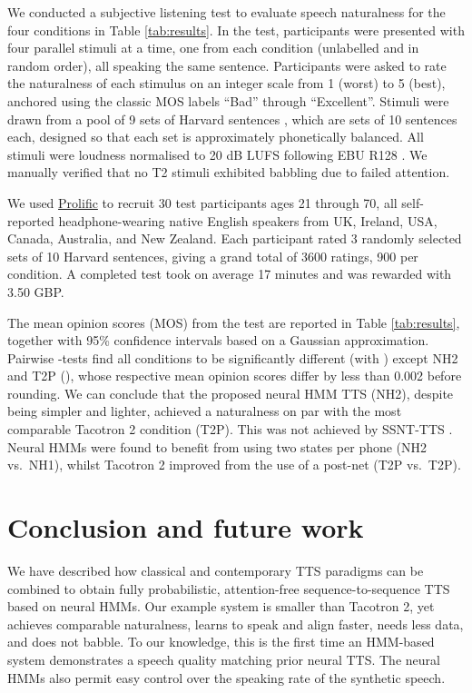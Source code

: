 \documentclass[british]{article}
\newcommand{\tc}{T2}
\newcommand{\tcp}{T2P}
\newcommand{\tcnop}{T2P}
\newcommand{\nhtwo}{NH2}
\newcommand{\nhone}{NH1}
\begin{document}
We conducted a subjective listening test to evaluate speech naturalness for the four conditions in Table \ref{tab:results}.
In the test, participants were presented with four parallel stimuli at a time, one from each condition (unlabelled and in random order), all speaking the same sentence.
Participants were asked to rate the naturalness of each stimulus on an integer scale from 1 (worst) to 5 (best), anchored using the classic MOS labels ``Bad'' through ``Excellent''.
Stimuli were drawn from a pool of 9 sets of Harvard sentences \cite{rothauser1969ieee}, which are sets of 10 sentences each, designed so that each set is approximately phonetically balanced.
All stimuli were loudness normalised to 20 dB LUFS following EBU R128 \cite{ebu2020loudness}.
We manually verified that no \tc{} stimuli exhibited babbling due to failed attention.

We used \href{https://prolific.co/}{Prolific} to recruit 30 test participants ages 21 through 70, all self-reported headphone-wearing native English speakers from UK, Ireland, USA, Canada, Australia, and New Zealand.
Each participant rated 3 randomly selected sets of 10 Harvard sentences, giving a grand total of 3600 ratings, 900 per condition.
A completed test took on average 17 minutes and was rewarded with 3.50 GBP.


The mean opinion scores (MOS) from the test are reported in Table \ref{tab:results}, together with 95\% confidence intervals based on a Gaussian approximation.
Pairwise -tests find all conditions to be significantly different (with ) except \nhtwo{} and \tcnop{} (),
whose respective mean opinion scores differ by less than 0.002 before rounding.
We can conclude that the proposed neural HMM TTS (\nhtwo{}), despite being simpler and lighter, achieved a naturalness on par with the most comparable Tacotron 2 condition (\tcnop{}).
This was not achieved by SSNT-TTS \cite{yasuda2019initial}.
Neural HMMs were found to benefit from using two states per phone (\nhtwo{} vs.\ \nhone{}), whilst
Tacotron 2 improved from the use of a post-net (\tcp{} vs.\ \tcnop{}).



\section{Conclusion and future work}
\label{sec:conclusion}
We have described how classical and contemporary TTS paradigms can be combined to obtain fully probabilistic, attention-free sequence-to-sequence TTS based on neural HMMs.
Our example system is smaller than Tacotron 2, yet achieves comparable naturalness, learns to speak and align faster, needs less data, and does not babble.
To our knowledge, this is the first time an HMM-based system demonstrates a speech quality matching prior neural TTS.
The neural HMMs also permit easy control over the speaking rate of the synthetic speech.
\end{document}
